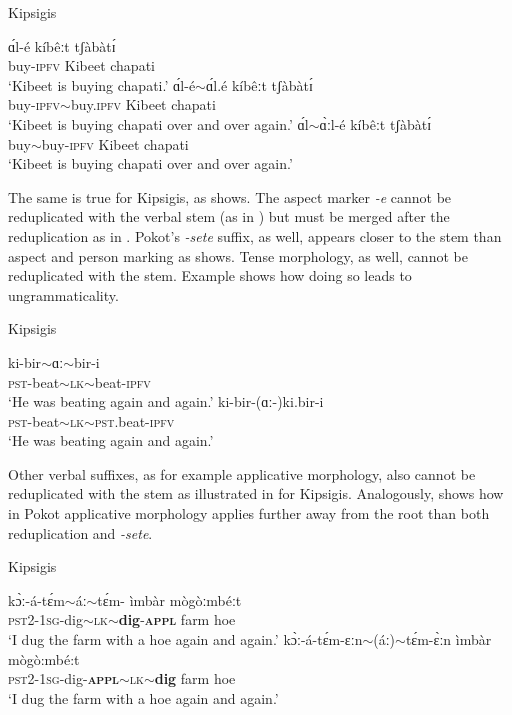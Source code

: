 \documentclass[output=paper,colorlinks,citecolor=brown
]{langscibook}
\begin{document}
\ea Kipsigis \label{ex:fiebig:KipAsp}
\begin{xlist}
\ex
\gll ɑ́l-é kíbêːt tʃàbàtɪ́\\
buy-\textsc{ipfv} Kibeet chapati\\
\glt`Kibeet is buying chapati.'
\ex \label{ex:fiebig:kipAspA}
\gll *ɑ́l-é$\sim$ɑ́l.é kíbêːt tʃàbàtɪ́\\
buy-\textsc{ipfv}$\sim$buy.\textsc{ipfv} Kibeet chapati\\
\glt`Kibeet is buying chapati over and over again.' 
\ex \label{ex:fiebig:kipAspB} 
\gll ɑ́l$\sim$ɑ̀ːl-é  kíbêːt tʃàbàtɪ́\\
buy$\sim$buy-\textsc{ipfv} Kibeet chapati\\
\glt`Kibeet is buying chapati over and over again.'
\end{xlist}
\z

\noindent The same is true for Kipsigis, as  shows. The aspect marker \textit{-e} cannot be reduplicated with the verbal stem (as in ) but must be merged after the reduplication as in . Pokot's \textit{-sete} suffix, as well, appears closer to the stem than aspect and person marking as  shows. 
Tense morphology, as well, cannot be reduplicated with the stem. Example  shows how doing so leads to ungrammaticality.

\ea Kipsigis \label{ex:fiebig:tense}
\begin{xlist}
\ex
\gll ki-bir$\sim$ɑː$\sim$bir-i\\
\textsc{pst}-beat$\sim$\textsc{lk}$\sim$beat-\textsc{ipfv}\\
\glt `He was beating again and again.'
\ex
\gll *ki-bir-(ɑː-)ki.bir-i\\
\textsc{pst}-beat$\sim$\textsc{lk$\sim$pst}.beat-\textsc{ipfv}\\
\glt `He was beating again and again.'
\end{xlist}
\z


\noindent Other verbal suffixes, as for example applicative morphology, also cannot be reduplicated with the stem as illustrated in  for Kipsigis. Analogously,  shows how in Pokot applicative morphology applies further away from the root than both reduplication and \textit{-sete}.

\ea Kipsigis \label{ex:fiebig:KipSize} 
\begin{xlist}
\ex
\gll  kɔ̀ː-á-tɛ́m$\sim$áː$\sim$tɛ́m- ìmbàr mògòːmbéːt\\
\textsc{pst2-1sg}-dig$\sim$\textsc{lk}$\sim$\textbf{dig}-\textsc{\textbf{appl}} farm hoe\\
\glt `I dug the farm with a hoe again and again.'
\ex
\gll *kɔ̀ː-á-tɛ́m-ɛːn$\sim$(áː)$\sim$tɛ́m-ɛ̀ːn ìmbàr mògò:mbé:t\\
\textsc{pst2-1sg}-dig-\textsc{\textbf{appl}}$\sim$\textsc{lk}$\sim$\textbf{dig} farm hoe\\
\glt `I dug the farm with a hoe again and again.'
\end{xlist}
\z
\end{document}

